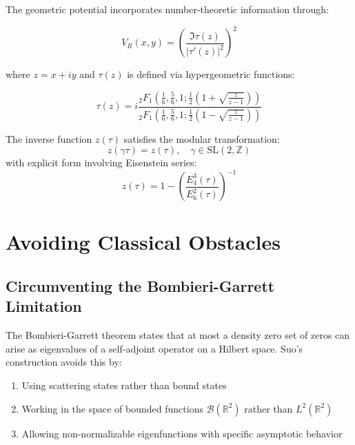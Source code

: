 The geometric potential incorporates number-theoretic information through:

\begin{equation}
V_R(x,y) = \left(\frac{\Im\tau(z)}{|\tau'(z)|^2}\right)^2
\end{equation}

where $z = x + iy$ and $\tau(z)$ is defined via hypergeometric functions:

\begin{equation}
\tau(z) = i\frac{{}_2F_1\left(\frac{1}{6}, \frac{5}{6}, 1; \frac{1}{2}\left(1 + \sqrt{\frac{z}{z-1}}\right)\right)}{{}_2F_1\left(\frac{1}{6}, \frac{5}{6}, 1; \frac{1}{2}\left(1 - \sqrt{\frac{z}{z-1}}\right)\right)}
\end{equation}

\begin{theorem}
The inverse function $z(\tau)$ satisfies the modular transformation:
\begin{equation}
z(\gamma\tau) = z(\tau), \quad \gamma \in \text{SL}(2,\mathbb{Z})
\end{equation}
with explicit form involving Eisenstein series:
\begin{equation}
z(\tau) = 1 - \left(\frac{E_4^3(\tau)}{E_6^2(\tau)}\right)^{-1}
\end{equation}
\end{theorem}

\section{Avoiding Classical Obstacles}

\subsection{Circumventing the Bombieri-Garrett Limitation}

The Bombieri-Garrett theorem states that at most a density zero set of zeros can arise as eigenvalues of a self-adjoint operator on a Hilbert space. Suo's construction avoids this by:

\begin{enumerate}
\item Using scattering states rather than bound states
\item Working in the space of bounded functions $\mathcal{B}(\mathbb{R}^2)$ rather than $L^2(\mathbb{R}^2)$
\item Allowing non-normalizable eigenfunctions with specific asymptotic behavior
\end{enumerate}


